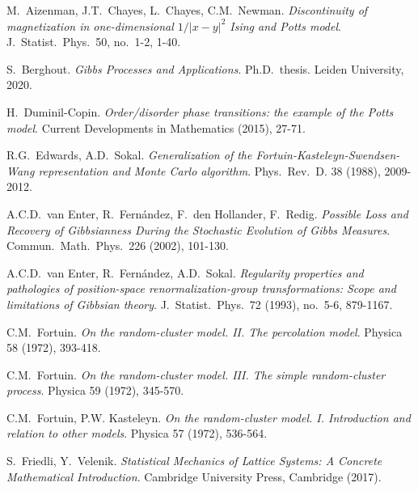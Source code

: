 \documentclass[12pt]{article}
\newcommand{\1}{\mathbbm{1}}
\newcommand{\5}{\vspace{0.5cm}}
\theoremstyle{definition}
\begin{document}
\pagebreak



\begin{thebibliography}{++}

 M.~Aizenman, J.T.~Chayes, L.~Chayes, C.M.~Newman. \textit{Discontinuity of magnetization in one-dimensional $1/|x-y|^2$ Ising and Potts model}. J.~Statist.~Phys.~50, no.~1-2, 1-40.

 S.~Berghout. \textit{Gibbs Processes and Applications}. Ph.D.~thesis. Leiden University, 2020.

 H.~Duminil-Copin. \textit{Order/disorder phase transitions: the example of the Potts model}. Current Developments in Mathematics (2015), 27-71.

 R.G.~Edwards, A.D.~Sokal. \textit{Generalization of the Fortuin-Kasteleyn-Swendsen-Wang representation and Monte Carlo algorithm}. Phys.~Rev.~D. 38 (1988), 2009-2012.

 A.C.D.~van Enter, R.~Fern\'andez, F.~den Hollander, F.~Redig. \textit{Possible Loss and Recovery of Gibbsianness During the Stochastic Evolution of Gibbs Measures}. Commun.~Math.~Phys.~226 (2002), 101-130.

 A.C.D.~van Enter, R.~Fern\'andez, A.D.~Sokal. \textit{Regularity properties and pathologies of position-space renormalization-group transformations: Scope and limitations of Gibbsian theory}. J.~Statist.~Phys.~72 (1993), no.~5-6, 879-1167.

 C.M.~Fortuin. \textit{On the random-cluster model. II. The percolation model}. Physica 58 (1972), 393-418.

 C.M.~Fortuin. \textit{On the random-cluster model. III. The simple random-cluster process}. Physica 59 (1972), 345-570.

 C.M.~Fortuin, P.W. Kasteleyn. \textit{On the random-cluster model. I. Introduction and relation to other models}. Physica 57 (1972), 536-564.

 S.~Friedli, Y.~Velenik. \textit{Statistical Mechanics of Lattice Systems: A Concrete Mathematical Introduction}. Cambridge University Press, Cambridge (2017).


\end{thebibliography}
\end{document}
